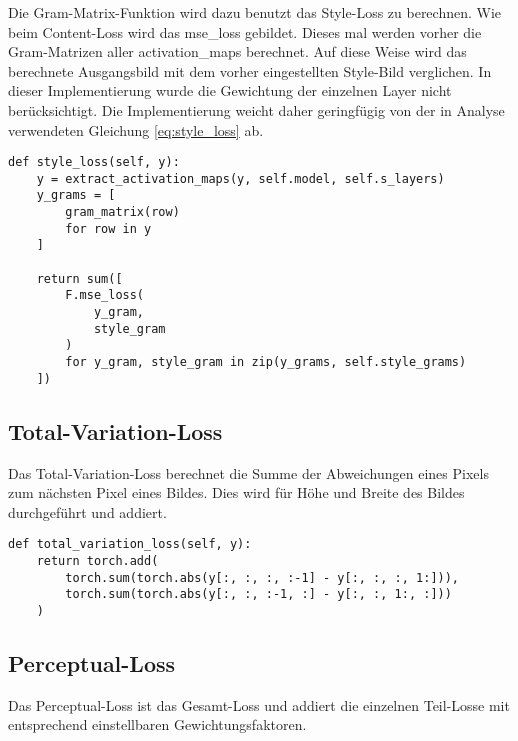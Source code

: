 \pagebreak

Die Gram-Matrix-Funktion wird dazu benutzt das Style-Loss zu berechnen. Wie beim Content-Loss wird das \gls{mse_loss} gebildet. Dieses mal werden vorher die Gram-Matrizen aller \gls{activation_map}s berechnet. Auf diese Weise wird das berechnete Ausgangsbild mit dem vorher eingestellten Style-Bild verglichen.
In dieser Implementierung wurde die Gewichtung der einzelnen Layer nicht berücksichtigt. Die Implementierung weicht daher geringfügig von der in Analyse verwendeten Gleichung \eqref{eq:style_loss} ab.

\begin{listing}[ht]
\begin{verbatim}
def style_loss(self, y):
    y = extract_activation_maps(y, self.model, self.s_layers)
    y_grams = [
        gram_matrix(row)
        for row in y
    ]

    return sum([
        F.mse_loss(
            y_gram,
            style_gram
        )
        for y_gram, style_gram in zip(y_grams, self.style_grams)
    ])
\end{verbatim}
\end{listing}

\subsection{Total-Variation-Loss}

Das Total-Variation-Loss berechnet die Summe der Abweichungen eines Pixels zum nächsten Pixel eines Bildes. Dies wird für Höhe und Breite des Bildes durchgeführt und addiert.

\begin{listing}[ht]
\begin{verbatim}
def total_variation_loss(self, y):
    return torch.add(
        torch.sum(torch.abs(y[:, :, :, :-1] - y[:, :, :, 1:])),
        torch.sum(torch.abs(y[:, :, :-1, :] - y[:, :, 1:, :]))
    )
\end{verbatim}
\end{listing}

\subsection{Perceptual-Loss}

Das Perceptual-Loss ist das Gesamt-Loss und addiert die einzelnen Teil-Losse mit entsprechend einstellbaren Gewichtungsfaktoren.


